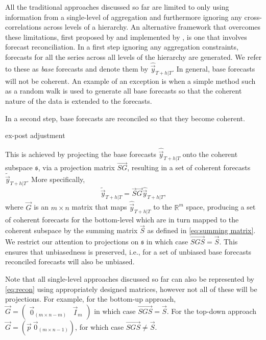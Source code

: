 \documentclass[graybox]{svmult}
\begin{document}
All the traditional approaches discussed so far are limited to only using information from a single-level of aggregation and furthermore ignoring any cross-correlations across levels of a hierarchy. An alternative framework that overcomes these limitations, first proposed by \citet{HynEtAl2011} and implemented by \citet{AthEtAl2009}, is one that involves forecast reconciliation. In a first step ignoring any aggregation constraints, forecasts for all the series across all levels of the hierarchy are generated. We refer to these as \textit{base} forecasts and denote them by $\hat{\vec{y}}_{T+h|T}$. In general, base forecasts will not be coherent. An example of an exception is when a simple method such as a random walk is used to generate all base forecasts so that the coherent nature of the data is extended to the forecasts.

In a second step, base forecasts are reconciled so that they become coherent. 

ex-post adjustment


This is achieved by projecting the base forecasts $\hat{\vec{y}}_{T+h|T}$ onto the coherent subspace $\mathfrak{s}$, via a projection matrix $\vec{SG}$, resulting in a set of coherent forecasts $\tilde{\vec{y}}_{T+h|T}$. More specifically,
\begin{equation}\label{eq:recon}
\tilde{\vec{y}}_{T+h|T}=\vec{S}\vec{G}\hat{\vec{y}}_{T+h|T},
\end{equation}
where $\vec{G}$ is an $m\times n$ matrix that maps $\hat{\vec{y}}_{T+h|T}$ to the $\mathbb{R}^m$ space, producing a set of coherent forecasts for the bottom-level which are in turn mapped to the coherent subspace by the summing matrix $\vec{S}$ as defined in \eqref{eq:summing matrix}. We restrict our attention to projections on $\mathfrak{s}$ in which case $\vec{SGS}=\vec{S}$. This ensures that unbiasedness is preserved, i.e., for a set of unbiased base forecasts reconciled forecasts will also be unbiased.



Note that all single-level approaches discussed so far can also be represented by \eqref{eq:recon} using appropriately designed  matrices, however not all of these will be projections. For example, for the bottom-up approach, $\vec{G}=\begin{pmatrix}
\vec{0}_{(m \times n-m)} & \vec{I}_m
\end{pmatrix}$ in which case $\vec{SGS}=\vec{S}$. For the top-down approach $\vec{G}=(\vec{p}~\vec{0}_{(m \times n-1)})$, for which case $\vec{SGS}\ne\vec{S}$.
\end{document}
